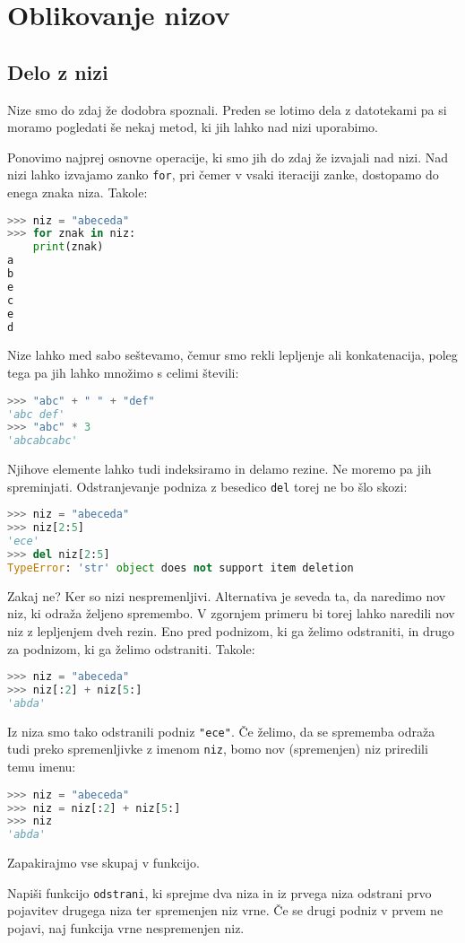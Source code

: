 \chapter{Oblikovanje nizov}

\section{Delo z nizi}

Nize smo do zdaj že dodobra spoznali. Preden se lotimo dela z datotekami pa si moramo pogledati še nekaj metod, ki jih lahko nad nizi uporabimo.

Ponovimo najprej osnovne operacije, ki smo jih do zdaj že izvajali nad nizi. Nad nizi lahko izvajamo zanko \texttt{for}, pri čemer v vsaki iteraciji zanke, dostopamo do enega znaka niza. Takole:
\begin{lstlisting}[language=Python]
>>> niz = "abeceda"
>>> for znak in niz:
	print(znak)
a
b
e
c
e
d
\end{lstlisting}
Nize lahko med sabo seštevamo, čemur smo rekli lepljenje ali konkatenacija, poleg tega pa jih lahko množimo s celimi števili:
\begin{lstlisting}[language=Python]
>>> "abc" + " " + "def"
'abc def'
>>> "abc" * 3
'abcabcabc'
\end{lstlisting}
Njihove elemente lahko tudi indeksiramo in delamo rezine. Ne moremo pa jih spreminjati. Odstranjevanje podniza z besedico \texttt{del} torej ne bo šlo skozi:
\begin{lstlisting}[language=Python]
>>> niz = "abeceda"
>>> niz[2:5]
'ece'
>>> del niz[2:5]
TypeError: 'str' object does not support item deletion
\end{lstlisting}
Zakaj ne? Ker so nizi nespremenljivi. Alternativa je seveda ta, da naredimo nov niz, ki odraža željeno spremembo. V zgornjem primeru bi torej lahko naredili nov niz z lepljenjem dveh rezin. Eno pred podnizom, ki ga želimo odstraniti, in drugo za podnizom, ki ga želimo odstraniti. Takole:
\begin{lstlisting}[language=Python]
>>> niz = "abeceda"
>>> niz[:2] + niz[5:]
'abda'
\end{lstlisting}
Iz niza smo tako odstranili podniz \texttt{"ece"}. Če želimo, da se sprememba odraža tudi preko spremenljivke z imenom \texttt{niz}, bomo nov (spremenjen) niz priredili temu imenu:
\begin{lstlisting}[language=Python]
>>> niz = "abeceda"
>>> niz = niz[:2] + niz[5:]
>>> niz
'abda'
\end{lstlisting}
Zapakirajmo vse skupaj v funkcijo.
\begin{zgled}
Napiši funkcijo \texttt{odstrani}, ki sprejme dva niza in iz prvega niza odstrani prvo pojavitev drugega niza ter spremenjen niz vrne. Če se drugi podniz v prvem ne pojavi, naj funkcija vrne nespremenjen niz.
\end{zgled}

